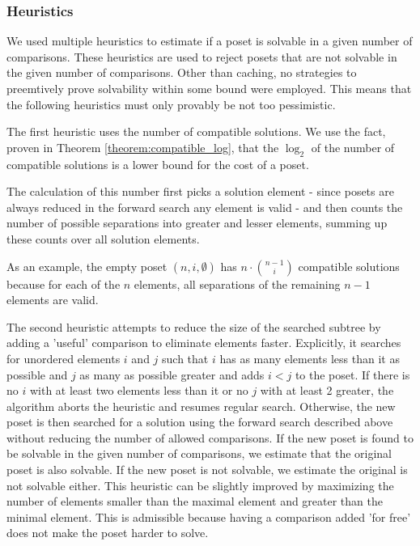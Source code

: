 \documentclass[10pt,journal,compsoc]{IEEEtran}
\begin{document}
\subsubsection{Heuristics}

We used multiple heuristics to estimate if a poset is solvable in a given number of comparisons.
These heuristics are used to reject posets that are not solvable in the given number of comparisons.
Other than caching, no strategies to preemtively prove solvability within
some bound were employed. This means that the following heuristics must
only provably be not too pessimistic.

The first heuristic uses the number of compatible solutions.
We use the fact, proven in Theorem \ref{theorem:compatible_log}, that the $\log_2$ of 
the number of compatible solutions is a lower bound for the cost of a poset.

The calculation of this number first picks a solution element - since posets
are always reduced in the forward search any element is valid - 
and then counts the number of possible separations into greater and lesser elements, 
summing up these counts over all solution elements.

As an example, the empty poset $(n,i,\emptyset)$ has $n\cdot\binom{n-1}{i}$ compatible solutions because
for each of the $n$ elements, all separations of the remaining $n-1$ elements
are valid.


The second heuristic attempts to reduce the size of the searched subtree by adding a
'useful' comparison to eliminate elements faster. Explicitly, it searches for 
unordered elements $i$ and $j$ such that $i$ has as many elements less than it as possible 
and $j$ as many as possible greater and adds $i<j$ to the poset.
If there is no $i$ with at least two elements less than it or no $j$ with
at least 2 greater, the algorithm aborts the heuristic and resumes
regular search.
Otherwise, the new poset is then searched for a solution using the forward search described above
without reducing the number of allowed comparisons.
If the new poset is found to be solvable in the given number of comparisons, we estimate that the original poset is also solvable.
If the new poset is not solvable, we estimate the original is not solvable either.
This heuristic can be slightly improved by maximizing the number of elements smaller than the maximal element and greater than the minimal element.
This is admissible because having a comparison added 'for free' does not make the
poset harder to solve.
\end{document}
